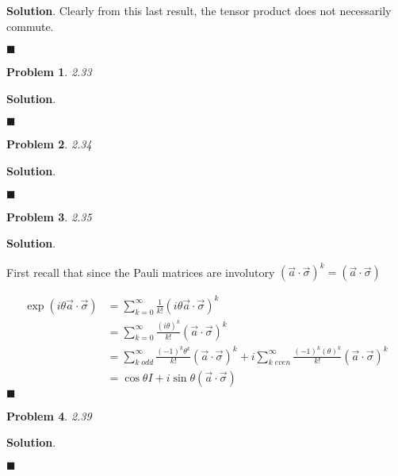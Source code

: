 \documentclass[12pt]{article}
\newtheorem{p}{Problem}
\theoremstyle{definition}
\newenvironment{s}{%
        \begin{trivlist} \item \textbf{Solution}. }{%
            \hspace*{\fill} $\blacksquare$\end{trivlist}}%
\begin{document}
{\begin{s}
Clearly from this last result, the tensor product does not necessarily commute.

\end{s}

\begin{p}
2.33
\end{p}

\begin{s}

\end{s}

\begin{p}
2.34
\end{p}

\begin{s}

\end{s}

\begin{p}
2.35
\end{p}

\begin{s}

First recall that since the Pauli matrices are involutory $\left(\vec{a}\cdot \vec{\sigma}\right)^{k}  = \left(\vec{a}\cdot \vec{\sigma}\right)$

\begin{align*}
\exp(i\theta\vec{a}\cdot \vec{\sigma}) &= \sum_{k=0}^{\infty}\frac{1}{k!}\left(i\theta\vec{a}\cdot \vec{\sigma}\right)^{k}\\
&=  \sum_{k=0}^{\infty}\frac{(i\theta)^{k}}{k!}\left(\vec{a}\cdot \vec{\sigma}\right)^{k}\\
&= \sum_{k \;odd}^{\infty}\frac{(-1)^{k}\theta^{k}}{k!}\left(\vec{a}\cdot \vec{\sigma}\right)^{k} + i\sum_{k \;even}^{\infty}\frac{(-1)^{k}(\theta)^{k}}{k!}\left(\vec{a}\cdot \vec{\sigma}\right)^{k}\\
&= \cos\theta I + i\sin\theta(\vec{a}\cdot\vec{\sigma})
\end{align*}
\end{s}

\begin{p}
2.39
\end{p}

\begin{s}

\end{s}
\end{document}
